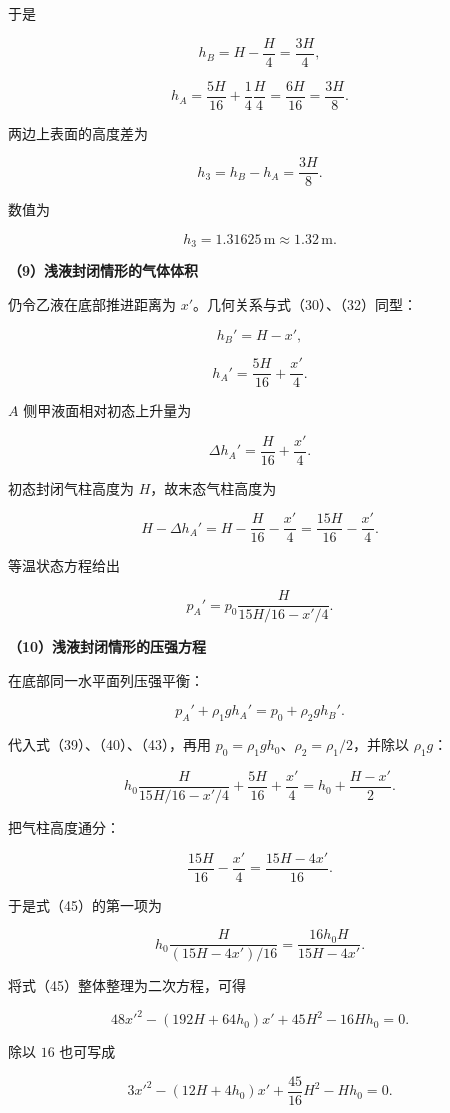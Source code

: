 \documentclass[12pt,a4paper,UTF8]{ctexart}
\begin{document}
于是

\[
h_B=H-\frac H4=\frac{3H}{4},
\tag{35}
\]

\[
h_A=\frac{5H}{16}+\frac1{4}\frac H4
=\frac{6H}{16}=\frac{3H}{8}.
\tag{36}
\]

两边上表面的高度差为

\[
\boxed{
h_3=h_B-h_A
=\frac{3H}{8}
}.
\tag{37}
\]

数值为

\[
\boxed{h_3=1.31625\,\mathrm m\approx1.32\,\mathrm m}.
\tag{38}
\]

\textbf{（9）浅液封闭情形的气体体积}

仍令乙液在底部推进距离为 \(x'\)。几何关系与式（30）、（32）同型：

\[
h_B'=H-x',
\tag{39}
\]

\[
h_A'=\frac{5H}{16}+\frac{x'}4.
\tag{40}
\]

\(A\) 侧甲液面相对初态上升量为

\[
\Delta h_A'
=\frac H{16}+\frac{x'}4.
\tag{41}
\]

初态封闭气柱高度为 \(H\)，故末态气柱高度为

\[
H-\Delta h_A'
=H-\frac H{16}-\frac{x'}4
=\frac{15H}{16}-\frac{x'}4.
\tag{42}
\]

等温状态方程给出

\[
\boxed{
p_A'
=p_0\frac{H}{15H/16-x'/4}
}.
\tag{43}
\]

\textbf{（10）浅液封闭情形的压强方程}

在底部同一水平面列压强平衡：

\[
p_A'+\rho_1gh_A'
=p_0+\rho_2gh_B'.
\tag{44}
\]

代入式（39）、（40）、（43），再用
\(p_0=\rho_1gh_0\)、\(\rho_2=\rho_1/2\)，并除以 \(\rho_1g\)：

\[
h_0\frac{H}{15H/16-x'/4}
+\frac{5H}{16}+\frac{x'}4
=h_0+\frac{H-x'}2.
\tag{45}
\]

把气柱高度通分：

\[
\frac{15H}{16}-\frac{x'}4
=\frac{15H-4x'}{16}.
\tag{46}
\]

于是式（45）的第一项为

\[
h_0\frac{H}{(15H-4x')/16}
=\frac{16h_0H}{15H-4x'}.
\tag{47}
\]

将式（45）整体整理为二次方程，可得

\[
48x'^2-(192H+64h_0)x'
+45H^2-16Hh_0=0.
\tag{48}
\]

除以 \(16\) 也可写成

\[
3x'^2-(12H+4h_0)x'
+\frac{45}{16}H^2-Hh_0=0.
\tag{49}
\]
\end{document}
